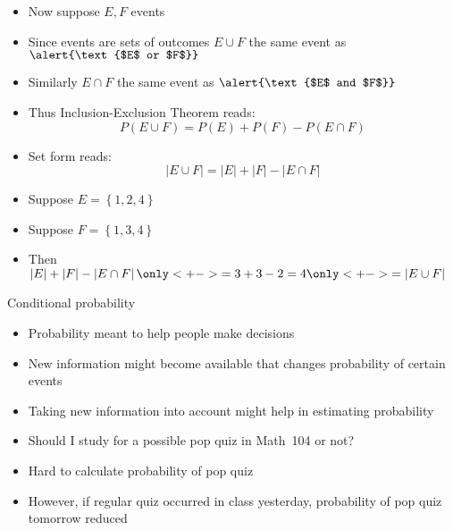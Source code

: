 \documentclass[handout]{beamer}
\theoremstyle{definition}
\begin{document}
\begin{frame}
\begin{itemize}
\item Now suppose $E,F$ events
\item Since events are sets of outcomes
$E\cup F$ the same event as $\alert{\text{$E$ or $F$}}$
\item Similarly
$E\cap F$ the same event as $\alert{\text{$E$ and $F$}}$
\item Thus Inclusion-Exclusion Theorem reads:
\[P\left(E\cup F\right)=P\left(E\right)
+P\left(F\right)-P\left(E\cap F\right)\]
\item Set form reads:
\[\left|E\cup F\right|=\left|E\right|
+\left|F\right|-\left|E\cap F\right|\]
\end{itemize}
\begin{example}
\begin{itemize}
\item Suppose $E=\left\{1,2,4\right\}$
\item Suppose $F=\left\{1,3,4\right\}$
\item Then $\left|E\right|
+\left|F\right|-\left|E\cap F\right|
\only<+->{=3+3-2=4}
\only<+->{=\left|E\cup F\right|}$
\end{itemize}
\end{example}
\end{frame}

\begin{frame}{Conditional probability}
\begin{itemize}
\item Probability meant to help people make decisions
\item New information might become available
that changes probability of certain events
\item Taking new information into account
might help in estimating probability
\end{itemize}
\begin{example}
\begin{itemize}
\item Should I study for a possible pop quiz in Math~104 or not?
\item Hard to calculate probability of pop quiz
\item However, if regular quiz occurred in class yesterday,
probability of pop quiz tomorrow reduced
\end{itemize}
\end{example}
\end{frame}
\end{document}
